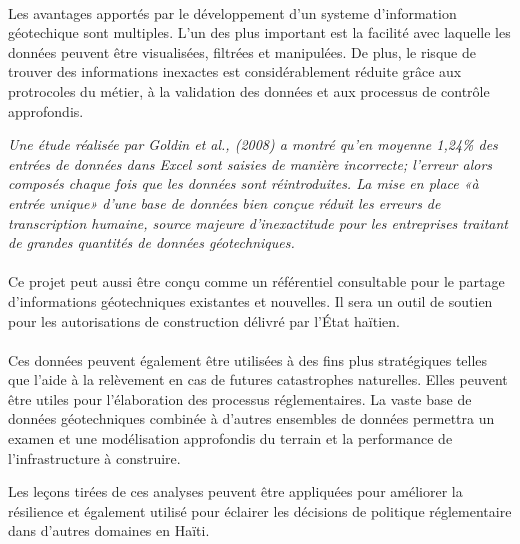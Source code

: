 \paragraph{}
Les avantages apportés par le développement d'un systeme d'information géotechique
sont multiples.
L'un des plus important est la facilité avec laquelle les données 
peuvent être visualisées, filtrées et manipulées.
De plus, le risque de trouver  des informations inexactes est considérablement
réduite grâce aux protrocoles du métier, à la validation des données et aux processus
de contrôle approfondis.

\textit{ Une 
étude réalisée par Goldin et al.,
(2008) a montré qu'en moyenne 1,24\% des entrées de données dans Excel 
sont saisies de manière incorrecte; l'erreur alors
composés chaque fois que les données sont réintroduites. La mise en place 
«à entrée unique» d’une base de données bien conçue réduit les erreurs de 
transcription humaine, source majeure d’inexactitude pour les entreprises
traitant de grandes quantités de données géotechniques.}
\cite{keen}
\paragraph{}
Ce projet peut aussi être
conçu comme un référentiel consultable pour le partage d'informations 
géotechniques existantes et nouvelles.
Il sera un outil de soutien pour les autorisations de construction délivré par l'État haïtien.
\paragraph{}
\par
Ces données peuvent également être utilisées à des fins plus stratégiques telles que l'aide à la
relèvement en cas de futures catastrophes naturelles.
Elles peuvent être utiles pour  l'élaboration des processus réglementaires.
La vaste base de données géotechniques
combinée à d'autres ensembles de données permettra un examen et une modélisation approfondis du terrain
et la performance de l'infrastructure à construire. 
\par
Les leçons tirées de ces analyses peuvent être appliquées pour
améliorer la résilience et également utilisé pour éclairer les 
décisions de politique réglementaire dans d'autres domaines en Haïti.
